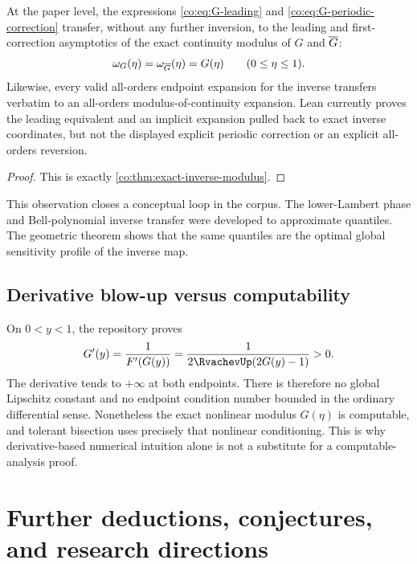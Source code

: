 \begin{corollary}
\label{co:cor:sharp-asymptotic-modulus}
At the paper level, the expressions \eqref{co:eq:G-leading} and
\eqref{co:eq:G-periodic-correction} transfer, without any further inversion, to
the leading and first-correction asymptotics of the exact continuity modulus
of $G$ and $\overline G$:
\begin{equation}\label{co:eq:asymptotic-modulus}
 \omega_G(\eta)=\omega_{\overline G}(\eta)=G(\eta)
 \qquad(0\le\eta\le1).
\end{equation}
Likewise, every valid all-orders endpoint expansion for the inverse transfers
verbatim to an all-orders modulus-of-continuity expansion.  Lean currently
proves the leading equivalent and an implicit expansion pulled back to exact
inverse coordinates, but not the displayed explicit periodic correction or
an explicit all-orders reversion.
\end{corollary}

\begin{proof}
This is exactly \cref{co:thm:exact-inverse-modulus}.
\end{proof}

This observation closes a conceptual loop in the corpus.  The lower-Lambert
phase and Bell-polynomial inverse transfer were developed to approximate
quantiles.  The geometric theorem shows that the same quantiles are the
optimal global sensitivity profile of the inverse map.

\subsection{Derivative blow-up versus computability}

On $0<y<1$, the repository proves
\begin{equation}\label{co:eq:inverse-derivative}
 G'(y)=\frac{1}{F'(G(y))}
 =\frac{1}{2\RvachevUp(2G(y)-1)}>0.
\end{equation}
The derivative tends to $+\infty$ at both endpoints.  There is therefore no
global Lipschitz constant and no endpoint condition number bounded in the
ordinary differential sense.  Nonetheless the exact nonlinear modulus
$G(\eta)$ is computable, and tolerant bisection uses precisely that nonlinear
conditioning.  This is why derivative-based numerical intuition alone is not
a substitute for a computable-analysis proof.

\section{Further deductions, conjectures, and research directions}
\label{co:sec:frontiers}

